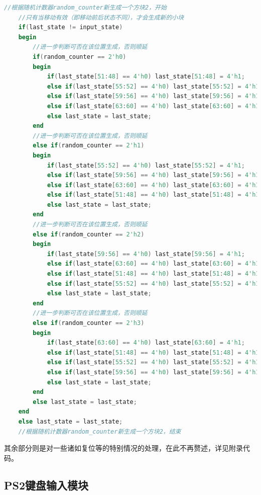 \documentclass[UTF8]{article}
\newcommand{\jumpline} {\hspace*{\fill} \par}
\begin{document}
	\begin{lstlisting}[language=Verilog]
	//根据随机计数器random_counter新生成一个方块2，开始
	//只有当移动有效（即移动前后状态不同），才会生成新的小块
	if(last_state != input_state)
	begin
		//进一步判断可否在该位置生成，否则顺延
		if(random_counter == 2'h0) 
		begin
			if(last_state[51:48] == 4'h0) last_state[51:48] = 4'h1;
			else if(last_state[55:52] == 4'h0) last_state[55:52] = 4'h1;
			else if(last_state[59:56] == 4'h0) last_state[59:56] = 4'h1;
			else if(last_state[63:60] == 4'h0) last_state[63:60] = 4'h1;
			else last_state = last_state;
		end
		//进一步判断可否在该位置生成，否则顺延
		else if(random_counter == 2'h1) 
		begin
			if(last_state[55:52] == 4'h0) last_state[55:52] = 4'h1;
			else if(last_state[59:56] == 4'h0) last_state[59:56] = 4'h1;
			else if(last_state[63:60] == 4'h0) last_state[63:60] = 4'h1;
			else if(last_state[51:48] == 4'h0) last_state[51:48] = 4'h1;
			else last_state = last_state;
		end
		//进一步判断可否在该位置生成，否则顺延
		else if(random_counter == 2'h2) 
		begin
			if(last_state[59:56] == 4'h0) last_state[59:56] = 4'h1;
			else if(last_state[63:60] == 4'h0) last_state[63:60] = 4'h1;
			else if(last_state[51:48] == 4'h0) last_state[51:48] = 4'h1;
			else if(last_state[55:52] == 4'h0) last_state[55:52] = 4'h1;
			else last_state = last_state;
		end
		//进一步判断可否在该位置生成，否则顺延
		else if(random_counter == 2'h3) 
		begin
			if(last_state[63:60] == 4'h0) last_state[63:60] = 4'h1;
			else if(last_state[51:48] == 4'h0) last_state[51:48] = 4'h1;
			else if(last_state[55:52] == 4'h0) last_state[55:52] = 4'h1;
			else if(last_state[59:56] == 4'h0) last_state[59:56] = 4'h1;
			else last_state = last_state;
		end
		else last_state = last_state;
	end
	else last_state = last_state;
	//根据随机计数器random_counter新生成一个方块2，结束
	\end{lstlisting}\par
	\jumpline
	其余部分则是对一些诸如复位等的特别情况的处理，在此不再赘述，详见附录代码。\par

	\subsection{PS2键盘输入模块}
\end{document}
